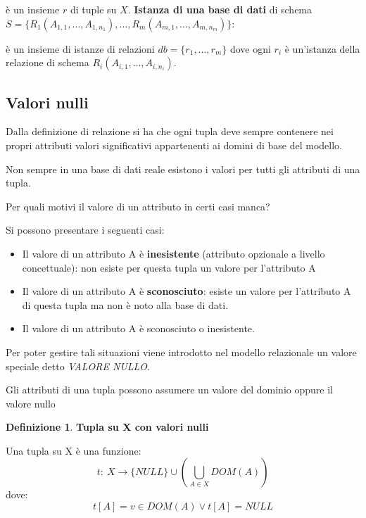 \documentclass[a4paper, 10pt]{article}
\theoremstyle{definition}
\newtheorem*{defn}{Definizione}
\begin{document}
		è un insieme $r$ di tuple su $X$.
		\newline
		\textbf{Istanza di una base di dati} di schema 
		$S = \{R_1 (A_{1,1} , \dots,A_{1,n_1} ), \dots, R_m (A_{m,1} , \dots, A_{m,n_m} )\}$:
		
		è un insieme di istanze di relazioni $db = \{r_1 , \dots, r_m \}$
		dove ogni $r_i$ è un'istanza della relazione di schema $R_i (A_{i,1} , \dots, A_{i,n_i} )$.
		
		
		\subsection{Valori nulli}
		
		Dalla definizione di relazione si ha che ogni tupla
		deve sempre contenere nei propri attributi valori
		significativi appartenenti ai domini di base del
		modello.
		
		Non sempre in una base di dati reale esistono i
		valori per tutti gli attributi di una tupla.
		
		Per quali motivi il valore di un attributo in certi casi
		manca?
		
		Si possono presentare i seguenti casi:
		\begin{itemize}
			\item Il valore di un attributo A è \textbf{inesistente} (attributo
			opzionale a livello concettuale): non esiste per questa
			tupla un valore per l'attributo A
			\item Il valore di un attributo A è \textbf{sconosciuto}: esiste un
			valore per l'attributo A di questa tupla ma non è noto
			alla base di dati.
			\item Il valore di un attributo A è sconosciuto o inesistente.
		\end{itemize}

		Per poter gestire tali situazioni viene introdotto nel
		modello relazionale un valore speciale detto
		\textit{VALORE NULLO}.
		
		Gli attributi di una tupla possono assumere un valore
		del dominio oppure il valore nullo

		\begin{defn}
			\textbf{Tupla su X con valori nulli}
			
			Una tupla su X è una funzione:
			\[
				t : \: X \rightarrow \{NULL\} \cup ( \bigcup_{A\in X} DOM (A))
			\]
			dove:
			\[
				t [ A ] = v \in DOM (A) \vee t[A] = NULL
			\]
			
		\end{defn}
\end{document}
